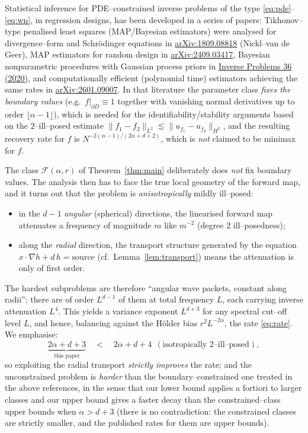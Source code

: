 \documentclass[11pt]{article}
\newcommand{\1}{\mathbf{1}}
\newcommand{\norm}[1]{\lVert #1\rVert}
\newcommand{\F}{\mathcal{F}}
\begin{document}
Statistical inference for PDE--constrained inverse problems of the type
\eqref{eq:pde}--\eqref{eq:wn}, in regression designs, has been developed in a series of
papers: Tikhonov--type penalised least squares (MAP/Bayesian estimators) were analysed
for divergence--form and Schr\"odinger equations in
\href{https://export.arxiv.org/pdf/1809.08818v3.pdf}{arXiv:1809.08818} (Nickl--van de Geer),
MAP estimators for random design in
\href{https://arxiv.org/html/2409.03417}{arXiv:2409.03417}, Bayesian nonparametric
procedures with Gaussian process priors in
\href{https://google.iopscience.iop.org/article/10.1088/1361-6420/ab7d2a}{Inverse Problems 36 (2020)},
and computationally efficient (polynomial time) estimators achieving the same rates in
\href{https://arxiv.org/html/2601.09007}{arXiv:2601.09007}. In that literature the
parameter class \emph{fixes the boundary values} (e.g.\ $f|_{\partial D}\equiv 1$ together
with vanishing normal derivatives up to order $\lfloor\alpha-1\rfloor$), which is needed
for the identifiability/stability arguments based on the $2$--ill--posed estimate
$\norm{f_1-f_2}_{L^2}\lesssim\norm{u_{f_1}-u_{f_2}}_{H^2}$, and the resulting recovery
rate for $f$ is $N^{-2(\alpha-1)/(2\alpha+d+2)}$, which is \emph{not} claimed to be minimax
for $f$.

The class $\F(\alpha,r)$ of Theorem~\ref{thm:main} deliberately does \emph{not} fix
boundary values. The analysis then has to face the true local geometry of the forward
map, and it turns out that the problem is \emph{anisotropically} mildly ill--posed:
\begin{itemize}
\item in the $d-1$ \emph{angular} (spherical) directions, the linearised forward map
attenuates a frequency of magnitude $m$ like $m^{-2}$ (degree $2$ ill--posedness);
\item along the \emph{radial} direction, the transport structure generated by the
equation $x\cdot\nabla h+d\,h=\text{source}$ (cf.\ Lemma~\ref{lem:transport}) means the
attenuation is only of first order.
\end{itemize}
The hardest subproblems are therefore ``angular wave packets, constant along radii'';
there are of order $L^{d-1}$ of them at total frequency $L$, each carrying inverse
attenuation $L^4$. This yields a variance exponent $L^{d+3}$ for any spectral cut--off
level $L$, and hence, balancing against the H\"older bias $r^2L^{-2\alpha}$, the rate
\eqref{eq:rate}. We emphasise:
\begin{equation*}
\underbrace{2\alpha+d+3}_{\text{this paper}}
\quad<\quad
2\alpha+d+4\ \ (\text{isotropically }2\text{--ill--posed}),
\end{equation*}
so exploiting the radial transport \emph{strictly improves} the rate; and the
unconstrained problem is \emph{harder} than the boundary--constrained one treated in
the above references, in the sense that our lower bound applies a fortiori to larger
classes and our upper bound gives a faster decay than the constrained--class upper
bounds when $\alpha>d+3$ (there is no contradiction: the constrained classes are
strictly smaller, and the published rates for them are upper bounds).
\end{document}

